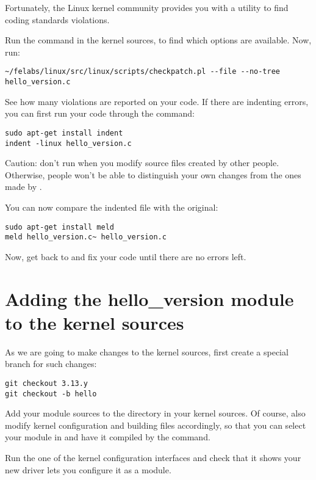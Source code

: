 Fortunately, the Linux kernel community provides you with a utility to
find coding standards violations.

Run the  command in the kernel sources,
to find which options are available.  Now, run:

\begin{verbatim}
~/felabs/linux/src/linux/scripts/checkpatch.pl --file --no-tree hello_version.c
\end{verbatim}

See how many violations are reported on your code. If there are
indenting errors, you can first run your code through the 
command:

\begin{verbatim}
sudo apt-get install indent
indent -linux hello_version.c
\end{verbatim}

Caution: don't run  when you modify source files created
by other people. Otherwise, people won't be able to distinguish your own
changes from the ones made by .

You can now compare the indented file with the original:

\begin{verbatim}
sudo apt-get install meld
meld hello_version.c~ hello_version.c
\end{verbatim}

Now, get back to  and fix your code until there are
no errors left.

\section{Adding the hello\_version module to the kernel sources}

As we are going to make changes to the kernel sources, first create a
special branch for such changes:

\begin{verbatim}
git checkout 3.13.y
git checkout -b hello
\end{verbatim}

Add your module sources to the  directory in your
kernel sources. Of course, also modify kernel configuration and
building files accordingly, so that you can select your module in
 and have it compiled by the  command.

Run the one of the kernel configuration interfaces and check that it
shows your new driver lets you configure it as a module.

